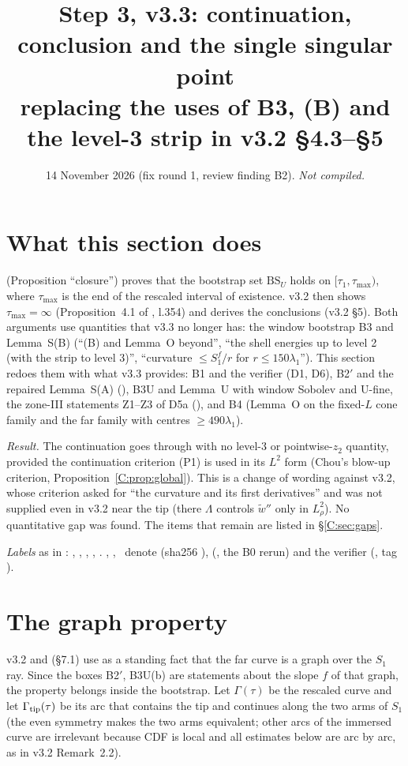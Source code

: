 \documentclass[11pt]{article}
\title{Step 3, v3.3: continuation, conclusion and the single singular point\\[2pt]\large replacing the uses of B3, (B) and the level-3 strip in v3.2 \S4.3--\S5}
\author{}\date{14 November 2026 (fix round 1, review finding B2). \emph{Not compiled.}}
\begin{document}
\maketitle
\fi

\section{What this section does}\label{C:sec:intro}
 (Proposition ``closure'') proves that the bootstrap set $\mathrm{BS}_U$ holds on $[\tau_1,\tau_{\max})$, where $\tau_{\max}$ is the end of the rescaled interval of existence. v3.2 then shows $\tau_{\max}=\infty$ (Proposition~4.1 of , l.354) and derives the conclusions (v3.2 \S5). Both arguments use quantities that v3.3 no longer has: the window bootstrap B3 and Lemma~S(B) (``(B) and Lemma~O beyond'', ``the shell energies up to level 2 (with the strip to level 3)'', ``curvature $\le S_1^f/r$ for $r\le150\lambda_1$''). This section redoes them with what v3.3 provides: B1 and the verifier (D1, D6), B2$'$ and the repaired Lemma~S(A) (), B3U and Lemma~U with window Sobolev and U-fine, the zone-III statements Z1--Z3 of D5a (), and B4 (Lemma~O on the fixed-$L$ cone family and the far family with centres $\ge490\lambda_1$).

\noindent\emph{Result.} The continuation goes through with no level-3 or pointwise-$z_2$ quantity, provided the continuation criterion (P1) is used in its $L^2$ form (Chou's blow-up criterion, Proposition~\ref{C:prop:global}). This is a change of wording against v3.2, whose criterion asked for ``the curvature and its first derivatives'' and was not supplied even in v3.2 near the tip (there $\Lambda$ controls $\tilde w''$ only in $L^2_\rho$). No quantitative gap was found. The items that remain are listed in \S\ref{C:sec:gaps}.

\noindent\emph{Labels} as in : \tC, \tP, \tH, \tE, \tB. \SU, \SZ, \SV\ denote  (sha256 ),  (, the B0 rerun) and the verifier  (, tag ).

\section{The graph property}\label{C:sec:graph}
v3.2 and  (\S7.1) use as a standing fact that the far curve is a graph over the $S_1$ ray. Since the boxes B2$'$, B3U(b) are statements about the slope $f$ of that graph, the property belongs inside the bootstrap. Let $\Gamma(\tau)$ be the rescaled curve and let $\Gamma_{\rm tip}(\tau)$ be its arc that contains the tip and continues along the two arms of $S_1$ (the even symmetry makes the two arms equivalent; other arcs of the immersed curve are irrelevant because CDF is local and all estimates below are arc by arc, as in v3.2 Remark~2.2).
\end{document}
